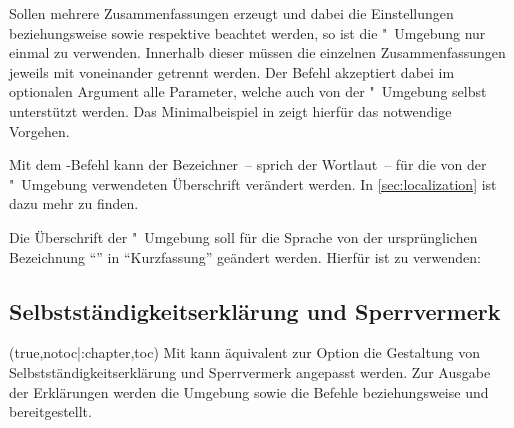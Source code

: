 \begin{DeclareEntity*}{}
\begin{DeclareEntity*}{}
\begin{DeclareEntity*}{}
\begin{Declaration}
\begin{Declaration}
\begin{Declaration}
\begin{Declaration}
\begin{Declaration}
\begin{Declaration}
\begin{Declaration}
%
Sollen mehrere Zusammenfassungen erzeugt und dabei die Einstellungen 
 beziehungsweise  sowie 
 respektive  beachtet werden, so 
ist die "~Umgebung nur einmal zu verwenden. Innerhalb 
dieser müssen die einzelnen Zusammenfassungen jeweils mit  
voneinander getrennt werden. Der Befehl akzeptiert dabei im optionalen Argument 
alle Parameter, welche auch von der "~Umgebung selbst 
unterstützt werden. Das Minimalbeispiel in  
zeigt hierfür das notwendige Vorgehen.
\end{Declaration}
\end{Declaration}
\end{Declaration}
\end{Declaration}
\end{Declaration}
\end{Declaration}
\end{Declaration}

%
Mit dem \KOMAScript-Befehl  kann der Bezeichner~-- 
sprich der Wortlaut~-- für die von der "~Umgebung 
verwendeten Überschrift verändert werden. In \autoref{sec:localization} ist
dazu mehr zu finden.
%
\begin{Example}
%
Die Überschrift der "~Umgebung soll für die Sprache 
 von der ursprünglichen Bezeichnung \enquote{\abstractname} in 
\enquote{Kurzfassung} geändert werden. Hierfür ist 
 zu 
verwenden:%
\begin{Code}[escapechar=§]
\end{Code}
\end{Example}



\subsection{%
  Selbstständigkeitserklärung und Sperrvermerk%
}
%
\begin{Declaration}
  {}
  (true,notoc|:chapter,toc)
\printdeclarationlist
%
Mit  kann äquivalent zur Option  die 
Gestaltung von Selbstständigkeitserklärung und Sperrvermerk angepasst werden.
Zur Ausgabe der Erklärungen werden die Umgebung  
sowie die Befehle  beziehungsweise  und 
 bereitgestellt. 


\end{Declaration}
\end{DeclareEntity*}
\end{DeclareEntity*}
\end{DeclareEntity*}
